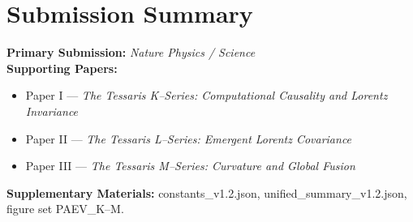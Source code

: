 \documentclass[11pt,a4paper]{article}
\begin{document}
\section*{Submission Summary}
\textbf{Primary Submission:} \emph{Nature Physics / Science}  
\\[0.3em]
\textbf{Supporting Papers:}
\begin{itemize}
  \item Paper I --- \textit{The Tessaris K--Series: Computational Causality and Lorentz Invariance}
  \item Paper II --- \textit{The Tessaris L--Series: Emergent Lorentz Covariance}
  \item Paper III --- \textit{The Tessaris M--Series: Curvature and Global Fusion}
\end{itemize}
\textbf{Supplementary Materials:} constants\_v1.2.json, unified\_summary\_v1.2.json, figure set PAEV\_K--M.
\end{document}
